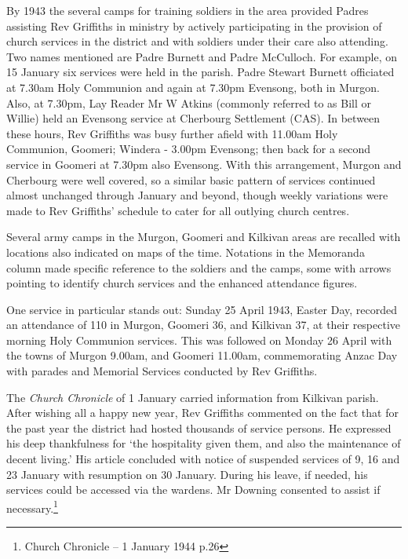 By 1943 the several camps for training soldiers in the area provided Padres assisting Rev Griffiths in ministry by actively participating in the provision of church services in the district and with soldiers under their care also attending. Two names mentioned are Padre Burnett and Padre McCulloch. For example, on 15 January six services were held in the parish. Padre Stewart Burnett officiated at 7.30am Holy Communion and again at 7.30pm Evensong, both in Murgon. Also, at 7.30pm, Lay Reader Mr W Atkins (commonly referred to as Bill or Willie) held an Evensong service at Cherbourg Settlement (CAS). In between these hours, Rev Griffiths was busy further afield with 11.00am Holy Communion, Goomeri; Windera - 3.00pm Evensong; then back for a second service in Goomeri at 7.30pm also Evensong. With this arrangement, Murgon and Cherbourg were well covered, so a similar basic pattern of services continued almost unchanged through January and beyond, though weekly variations were made to Rev Griffiths' schedule to cater for all outlying church centres.

Several army camps in the Murgon, Goomeri and Kilkivan areas are recalled with locations also indicated on maps of the time. Notations in the Memoranda column made specific reference to the soldiers and the camps, some with arrows pointing to identify church services and the enhanced attendance figures.

One service in particular stands out: Sunday 25 April 1943, Easter Day, recorded an attendance of 110 in Murgon, Goomeri 36, and Kilkivan 37, at their respective morning Holy Communion services. This was followed on Monday 26 April with the towns of Murgon 9.00am, and Goomeri 11.00am, commemorating Anzac Day with parades and Memorial Services conducted by Rev Griffiths.

The \emph{Church Chronicle} of 1 January carried information from Kilkivan parish. After wishing all a happy new year, Rev Griffiths commented on the fact that for the past year the district had hosted thousands of service persons. He expressed his deep thankfulness for `the hospitality given them, and also the maintenance of decent living.' His article concluded with notice of suspended services of 9, 16 and 23 January with resumption on 30 January. During his leave, if needed, his services could be accessed via the wardens. Mr Downing consented to assist if necessary.\footnote{Church Chronicle -- 1 January 1944 p.26}

